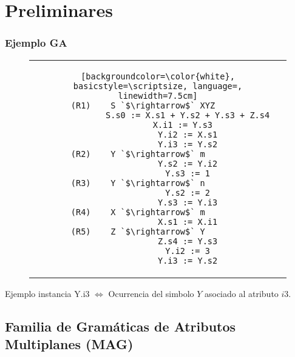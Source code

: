 \documentclass[10pt]{beamer}
\begin{document}
\section{Preliminares}


\begin{frame}[fragile]
    \frametitle{Ejemplo GA}


\begin{figure}[h]
\begin{center}
\begin{tabular}{c}
\begin{lstlisting}[backgroundcolor=\color{white}, basicstyle=\scriptsize, language=, linewidth=7.5cm]
(R1)    S `$\rightarrow$` XYZ      
            S.s0 := X.s1 + Y.s2 + Y.s3 + Z.s4
            X.i1 := Y.s3  
            Y.i2 := X.s1
            Y.i3 := Y.s2
(R2)    Y `$\rightarrow$` m        
            Y.s2 := Y.i2
            Y.s3 := 1
(R3)    Y `$\rightarrow$` n        
            Y.s2 := 2
            Y.s3 := Y.i3
(R4)    X `$\rightarrow$` m        
            X.s1 := X.i1
(R5)    Z `$\rightarrow$` Y        
            Z.s4 := Y.s3
            Y.i2 := 3
            Y.i3 := Y.s2
\end{lstlisting} 
\end{tabular}
\end{center}
\end{figure}

    \begin{block}{Ejemplo instancia}
        Y.i3 $\Leftrightarrow$ Ocurrencia del simbolo $Y$ asociado al atributo $i3$.
    \end{block}
\end{frame}

\subsection{Familia de Gramáticas de Atributos Multiplanes (MAG)}
\end{document}
